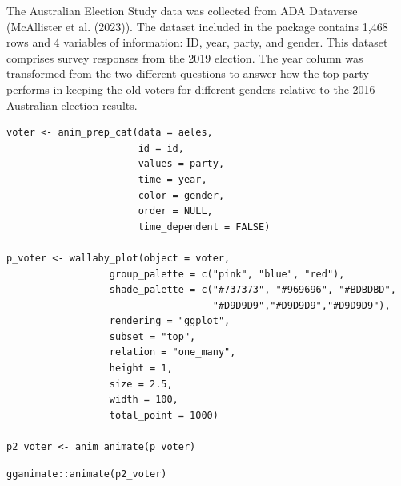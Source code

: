 The Australian Election Study data was collected from ADA Dataverse (McAllister et al. (2023)). The dataset included in the  package contains 1,468 rows and 4 variables of information: ID, year, party, and gender. This dataset comprises survey responses from the 2019 election. The year column was transformed from the two different questions to answer how the top party performs in keeping the old voters for different genders relative to the 2016 Australian election results.

\begin{verbatim}
voter <- anim_prep_cat(data = aeles,
                       id = id,
                       values = party,
                       time = year,
                       color = gender,
                       order = NULL,
                       time_dependent = FALSE)

p_voter <- wallaby_plot(object = voter,
                  group_palette = c("pink", "blue", "red"),
                  shade_palette = c("#737373", "#969696", "#BDBDBD",
                                    "#D9D9D9","#D9D9D9","#D9D9D9"),
                  rendering = "ggplot",
                  subset = "top",
                  relation = "one_many",
                  height = 1,
                  size = 2.5,
                  width = 100,
                  total_point = 1000)

p2_voter <- anim_animate(p_voter)
\end{verbatim}

\begin{verbatim}
gganimate::animate(p2_voter)
\end{verbatim}

